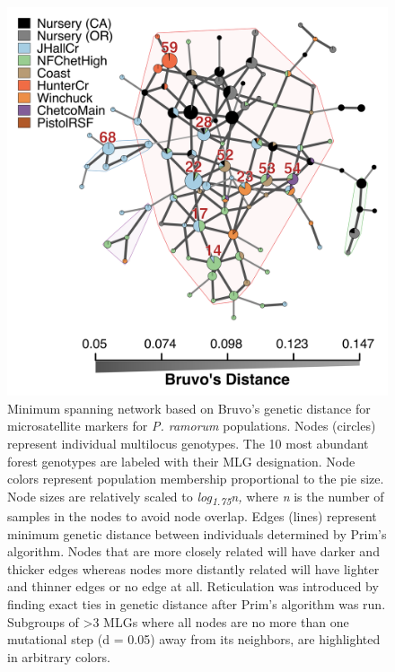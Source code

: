 \documentclass[double,12pt]{beavtex}
\begin{document}
  \begin{figure}
  
  {\centering \includegraphics[width=0.8\linewidth]{figure/phytopathology/figure_3} 
  
  }
  
  \caption[Minimum spanning network based on Bruvo's genetic distance for
  microsatellite markers for \emph{P. ramorum} populations.]{Minimum spanning network based on Bruvo's genetic distance for
  microsatellite markers for \emph{P. ramorum} populations. Nodes
  (circles) represent individual multilocus genotypes. The 10 most
  abundant forest genotypes are labeled with their MLG designation. Node
  colors represent population membership proportional to the pie size.
  Node sizes are relatively scaled to \emph{log\textsubscript{1.75}n,}
  where \emph{n} is the number of samples in the nodes to avoid node
  overlap. Edges (lines) represent minimum genetic distance between
  individuals determined by Prim's algorithm. Nodes that are more closely
  related will have darker and thicker edges whereas nodes more distantly
  related will have lighter and thinner edges or no edge at all.
  Reticulation was introduced by finding exact ties in genetic distance
  after Prim's algorithm was run. Subgroups of \textgreater{}3 MLGs where
  all nodes are no more than one mutational step (d = 0.05) away from its
  neighbors, are highlighted in arbitrary colors.}\label{fig:ramorum3}
  \end{figure}
  
  \newpage
  
\end{document}
